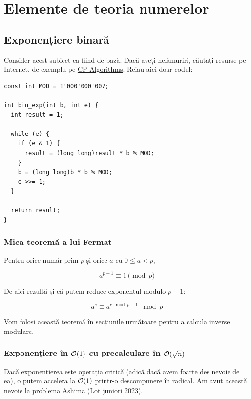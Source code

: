 \documentclass[../main.tex]{subfiles}
\begin{document}
\chapter{Elemente de teoria numerelor}

\section{Exponențiere binară}

Consider acest subiect ca fiind de bază. Dacă aveți nelămuriri, căutați resurse pe Internet, de exemplu pe \href{https://cp-algorithms.com/algebra/binary-exp.html}{CP Algorithms}. Reiau aici doar codul:

\begin{verbatim}
const int MOD = 1'000'000'007;

int bin_exp(int b, int e) {
  int result = 1;

  while (e) {
    if (e & 1) {
      result = (long long)result * b % MOD;
    }
    b = (long long)b * b % MOD;
    e >>= 1;
  }

  return result;
}
\end{verbatim}

\subsection{Mica teoremă a lui Fermat}

Pentru orice număr prim $p$ și orice $a$ cu $0 \leq a < p$,

$$a^{p-1} \equiv 1 \pmod{p}$$

De aici rezultă și că putem reduce exponentul modulo $p-1$:

$$a^e \equiv a^{e \mod p - 1} \mod p$$

Vom folosi această teoremă în secțiunile următoare pentru a calcula inverse modulare.

\subsection{Exponențiere în \texorpdfstring{$\mathcal{O}(1)$}{O(1)} cu precalculare în \texorpdfstring{$\mathcal{O}(\sqrt{n})$}{O(sqrt(n)}}

Dacă exponențierea este operația critică (adică dacă avem foarte des nevoie de ea), o putem accelera la $\mathcal{O}(1)$ printr-o descompunere în radical. Am avut această nevoie la problema \href{https://kilonova.ro/problems/637}{Ashima} (Lot juniori 2023).
\end{document}
